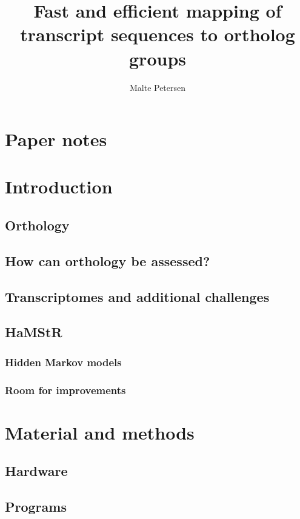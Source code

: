 \documentclass[a4paper,12pt]{scrreprt}
\title{Fast and efficient mapping of transcript sequences to ortholog groups}
\author{Malte Petersen}
\newcommand{\hamstr}{HaMStR\xspace}
\begin{document}
\maketitle
\pagestyle{headings}
\tableofcontents

\chapter*{Paper notes}
	



\chapter{Introduction}
	
	\section{Orthology}
		
	\section{How can orthology be assessed?}
		
	\section{Transcriptomes and additional challenges}
		
	\section{\hamstr}
		
		\subsection{Hidden Markov models}
			
		\subsection{Room for improvements}
			

\chapter{Material and methods}
	\section{Hardware}
		
	\section{Programs}
		
\end{document}
